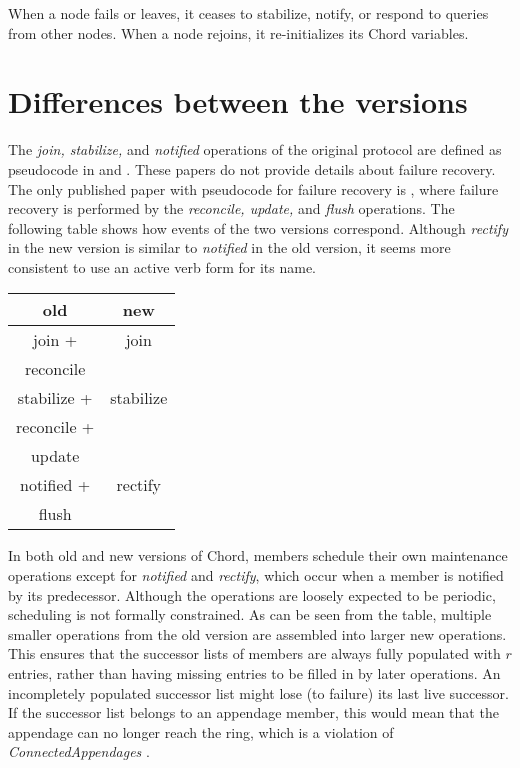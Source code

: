 \documentclass[conference]{IEEEtran}
\begin{document}
When a node fails or leaves,
it ceases to stabilize, notify, or respond to queries
from other nodes.
When a node rejoins, it re-initializes its Chord variables.

\section{Differences between the versions}
\label{sec:diff}

The {\it join, stabilize,} and {\it notified}
operations of the original protocol are defined as pseudocode in
\cite{chord-sigcomm} and \cite{chord-ton}.
These papers do not provide details about failure recovery.
The only published paper with pseudocode for failure recovery is
\cite{chord-podc}, where failure recovery is
performed by the
{\it reconcile, update,} and {\it flush} operations.
The following table shows how events of the two versions correspond.
Although {\it rectify} in the new version is similar to
{\it notified} in the old version, it seems more consistent to use
an active verb form for its name.

\begin{center}
\footnotesize
\begin{tabular}{|c|c|}
\hline
{\bf old} & {\bf new} \\ \hline
join +	& join \\
reconcile &  \\ \hline
stabilize + & stabilize \\
reconcile + & \\
update & \\ \hline
notified + & rectify \\
flush & \\ \hline
\end{tabular}
\normalsize
\end{center}

In both old and new versions of Chord, members schedule their own
maintenance operations except for {\it notified} and
{\it rectify}, which occur when a member is notified by its 
predecessor.
Although the operations
are loosely expected to be periodic, scheduling is not formally
constrained.
As can be seen from the table, 
multiple smaller operations from the old version
are assembled into larger new operations.
This ensures that the successor lists of members are always fully
populated with $r$ entries,
rather than having missing entries to be filled in by later
operations.
An incompletely populated successor list might lose (to failure)
its last live
successor.
If the successor list belongs to an appendage member, this would mean
that the appendage can no longer reach the ring, which is
a violation of {\it ConnectedAppendages} \cite{chord-ccr}.
\end{document}

